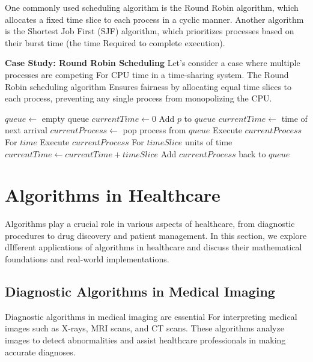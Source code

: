 \documentclass[12pt]{book} %
\begin{document}
One commonly used scheduling algorithm is the Round Robin algorithm, which allocates a fixed time slice to each process in a cyclic manner. Another algorithm is the Shortest Job First (SJF) algorithm, which prioritizes processes based on their burst time (the time Required to complete execution).

\textbf{Case Study: Round Robin Scheduling}
Let's consider a case where multiple processes are competing For CPU time in a time-sharing system. The Round Robin scheduling algorithm Ensures fairness by allocating equal time slices to each process, preventing any single process from monopolizing the CPU.

\FloatBarrier
\begin{algorithm}
\caption{Round Robin Scheduling}
\begin{algorithmic}[1]
    \State $queue \gets$ empty queue
    \State $currentTime \gets 0$
                \State Add $p$ to $queue$
            \EndIf
        \EndFor
            \State $currentTime \gets$ time of next arrival
        \Else
            \State $currentProcess \gets$ pop process from $queue$
            \State Execute $currentProcess$ For $time$
            \State Execute $currentProcess$ For $timeSlice$ units of time
                    \State $currentTime \gets currentTime + timeSlice$
                    \State Add $currentProcess$ back to $queue$
                \EndIf
        \EndIf
    \EndWhile
\EndProcedure
\end{algorithmic}
\end{algorithm}
\FloatBarrier


\section{Algorithms in Healthcare}
Algorithms play a crucial role in various aspects of healthcare, from diagnostic procedures to drug discovery and patient management. In this section, we explore dIfferent applications of algorithms in healthcare and discuss their mathematical foundations and real-world implementations.

\subsection{Diagnostic Algorithms in Medical Imaging}
Diagnostic algorithms in medical imaging are essential For interpreting medical images such as X-rays, MRI scans, and CT scans. These algorithms analyze images to detect abnormalities and assist healthcare professionals in making accurate diagnoses. 
\end{document}

